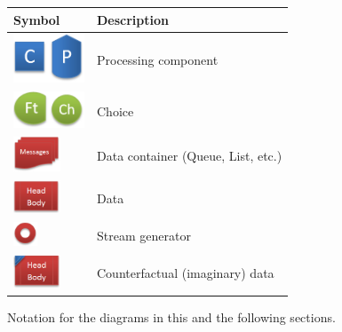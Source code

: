 \begin{figure}
	\begin{center}
		\begin{tabular}{l l}
			\toprule
			Symbol & Description\\
			\midrule
			
			\begin{minipage}[t]{0.2\textwidth}
				\includegraphics[width=60pt]{Figs/legend_proc.png}
			\end{minipage}
			& Processing component\\
			\includegraphics[width=60pt]{Figs/legend_choice.png} & Choice\\
			\includegraphics[width=40pt]{Figs/legend_container.png} & Data container (Queue, List, etc.)\\
			\includegraphics[width=40pt]{Figs/legend_data.png} & Data\\
			\includegraphics[width=20pt]{Figs/legend_generator.png} & Stream generator\\
			\includegraphics[width=40pt]{Figs/legend_imaginary.png} & Counterfactual (imaginary) data\\
			\bottomrule
		\end{tabular}
	\end{center}
	\caption{Notation for the diagrams in this and the following sections.}
	\label{fig:diagramNotation}
\end{figure}
%


